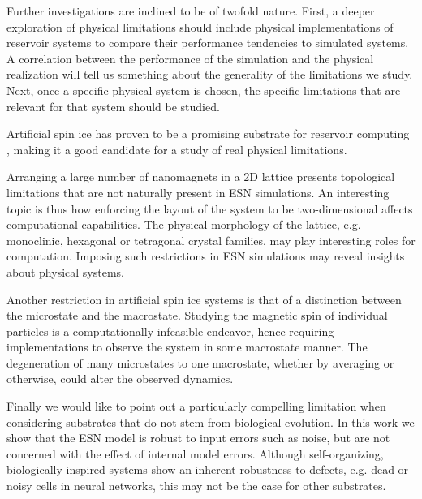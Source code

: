 Further investigations are inclined to be of twofold nature. First, a deeper
exploration of physical limitations should include physical implementations of
reservoir systems to compare their performance tendencies to simulated
systems. A correlation between the performance of the simulation and the
physical realization will tell us something about the generality of the
limitations we study. Next, once a specific physical system is chosen, the
specific limitations that are relevant for that system should be studied.

Artificial spin ice has proven to be a promising substrate for reservoir
computing \cite{jensen_computation_2018}, making it a good candidate for a study
of real physical limitations.

Arranging a large number of nanomagnets in a 2D lattice presents topological
limitations that are not naturally present in ESN simulations. An interesting
topic is thus how enforcing the layout of the system to be two-dimensional
affects computational capabilities. The physical morphology of the lattice,
e.g. monoclinic, hexagonal or tetragonal crystal families, may play interesting
roles for computation. Imposing such restrictions in ESN simulations may reveal
insights about physical systems.

Another restriction in artificial spin ice systems is that of a distinction
between the microstate and the macrostate. Studying the magnetic spin of
individual particles is a computationally infeasible endeavor, hence requiring
implementations to observe the system in some macrostate manner. The
degeneration of many microstates to one macrostate, whether by averaging or
otherwise, could alter the observed dynamics.

Finally we would like to point out a particularly compelling limitation when
considering substrates that do not stem from biological evolution. In this work
we show that the ESN model is robust to input errors such as noise, but are not
concerned with the effect of internal model errors. Although self-organizing,
biologically inspired systems show an inherent robustness to defects, e.g. dead
or noisy cells in neural networks, this may not be the case for other
substrates.

